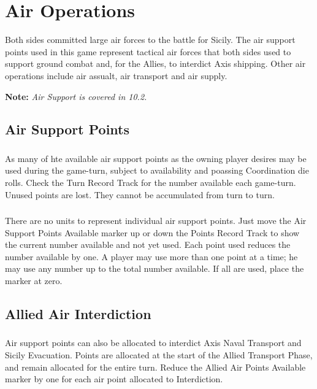 \section{Air Operations}

Both sides committed large air forces to the battle for Sicily. The air support points used in this game represent tactical air forces that both sides used to support ground combat and, for the Allies, to interdict Axis shipping. Other air operations include air assualt, air transport and air supply.

\textbf{Note:} \textit{Air Support is covered in 10.2.}

\subsection{Air Support Points}

\subsubsection{}
As many of hte available air support points as the owning player desires may be used during the game-turn, subject to availability and poassing Coordination die rolls. Check the Turn Record Track for the number available each game-turn. Unused points are lost. They cannot be accumulated from turn to turn.

\subsubsection{}
There are no units to represent individual air support points. Just move the Air Support Points Available marker up or down the Points Record Track to show the current number available and not yet used. Each point used reduces the number available by one. A player may use more than one point at a time; he may use any number up to the total number available. If all are used, place the marker at zero.

\subsection{Allied Air Interdiction}

\subsubsection{}
Air support points can also be allocated to interdict Axis Naval Transport and Sicily Evacuation. Points are allocated at the start of the Allied Transport Phase, and remain allocated for the entire turn. Reduce the Allied Air Points Available marker by one for each air point allocated to Interdiction.

